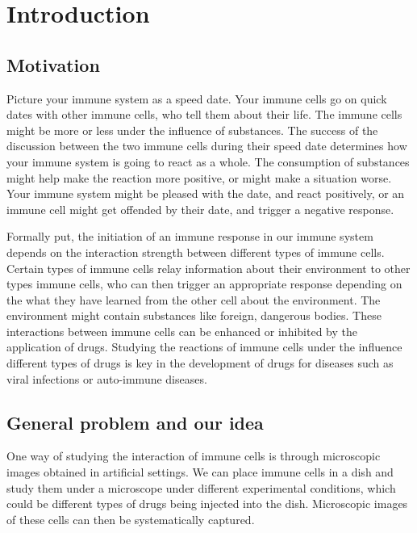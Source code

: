 \chapter{Introduction}

\section{Motivation}

Picture your immune system as a speed date. Your immune cells go on quick dates with other immune cells, who tell them about their life. The immune cells might be more or less under the influence of substances. The success of the discussion between the two immune cells during their speed date determines how your immune system is going to react as a whole. The consumption of substances might help make the reaction more positive, or might make a situation worse. Your immune system might be pleased with the date, and react positively, or an immune cell might get offended by their date, and trigger a negative response. %


Formally put, the initiation of an immune response in our immune system depends on the interaction strength between different types of immune cells. Certain types of immune cells relay information about their environment to other types immune cells, who can then trigger an appropriate response depending on the what they have learned from the other cell about the environment. The environment might contain substances like foreign, dangerous bodies. These interactions between immune cells can be enhanced or inhibited by the application of drugs. Studying the reactions of immune cells under the influence different types of drugs is key in the development of drugs for diseases such as viral infections or auto-immune diseases. 

\section{General problem and our idea}

One way of studying the interaction of immune cells is through microscopic images obtained in artificial settings. We can place immune cells in a dish and study them under a microscope under different experimental conditions, which could be different types of drugs being injected into the dish. Microscopic images of these cells can then be systematically captured.

